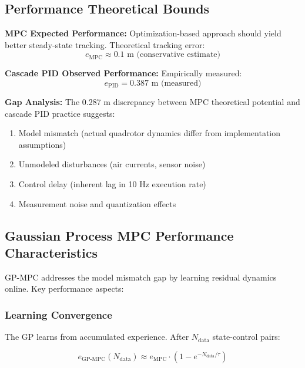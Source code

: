 \documentclass[journal]{IEEEtran}
\begin{document}
\subsection{Performance Theoretical Bounds}

\textbf{MPC Expected Performance:} Optimization-based approach should yield better steady-state tracking. Theoretical tracking error:
\begin{equation}
e_{\text{MPC}} \approx 0.1 \text{ m (conservative estimate)}
\end{equation}

\textbf{Cascade PID Observed Performance:} Empirically measured:
\begin{equation}
e_{\text{PID}} = 0.387 \text{ m (measured)}
\end{equation}

\textbf{Gap Analysis:} The 0.287 m discrepancy between MPC theoretical potential and cascade PID practice suggests:
\begin{enumerate}
    \item Model mismatch (actual quadrotor dynamics differ from implementation assumptions)
    \item Unmodeled disturbances (air currents, sensor noise)
    \item Control delay (inherent lag in 10 Hz execution rate)
    \item Measurement noise and quantization effects
\end{enumerate}

\subsection{Gaussian Process MPC Performance Characteristics}

GP-MPC addresses the model mismatch gap by learning residual dynamics online. Key performance aspects:

\subsubsection{Learning Convergence}

The GP learns from accumulated experience. After $N_{\text{data}}$ state-control pairs:

\begin{equation}
e_{\text{GP-MPC}}(N_{\text{data}}) \approx e_{\text{MPC}} \cdot (1 - e^{-N_{\text{data}}/\tau})
\label{eq:gp_learning_curve}
\end{equation}
\end{document}
